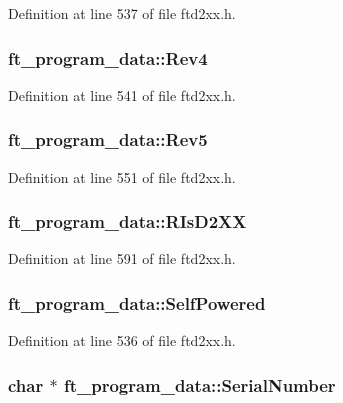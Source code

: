 Definition at line 537 of file ftd2xx.h.\hypertarget{structft__program__data_aa0dc9b6f09c70bde10b560e3e122e79d}{
\subsubsection[{Rev4}]{ {\bf ft\_\-program\_\-data::Rev4}}}
\label{structft__program__data_aa0dc9b6f09c70bde10b560e3e122e79d}


Definition at line 541 of file ftd2xx.h.\hypertarget{structft__program__data_a512aeedfb289bc6cda7aa28da4d5d40e}{
\subsubsection[{Rev5}]{ {\bf ft\_\-program\_\-data::Rev5}}}
\label{structft__program__data_a512aeedfb289bc6cda7aa28da4d5d40e}


Definition at line 551 of file ftd2xx.h.\hypertarget{structft__program__data_aec99738794a078897df1e4b893117f82}{
\subsubsection[{RIsD2XX}]{ {\bf ft\_\-program\_\-data::RIsD2XX}}}
\label{structft__program__data_aec99738794a078897df1e4b893117f82}


Definition at line 591 of file ftd2xx.h.\hypertarget{structft__program__data_ad714af31e3592d4c3be2742ae9612616}{
\subsubsection[{SelfPowered}]{ {\bf ft\_\-program\_\-data::SelfPowered}}}
\label{structft__program__data_ad714af31e3592d4c3be2742ae9612616}


Definition at line 536 of file ftd2xx.h.\hypertarget{structft__program__data_a81ddee025aa0fa0b48189fb0ee7c5b46}{
\subsubsection[{SerialNumber}]{\setlength{\rightskip}{0pt plus 5cm}char $\ast$ {\bf ft\_\-program\_\-data::SerialNumber}}}
\label{structft__program__data_a81ddee025aa0fa0b48189fb0ee7c5b46}


